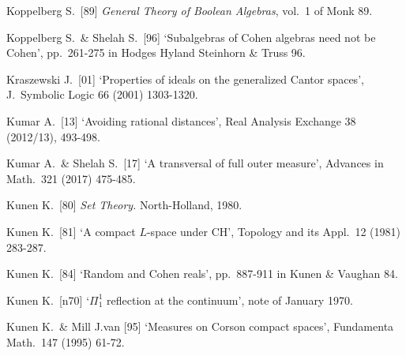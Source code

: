 {Koppelberg S.\ [89] {\it General Theory of Boolean
Algebras\/}, vol.\ 1 of {\smc Monk 89}.
\cmmnt{[\S515 {\it notes\/}.]}

Koppelberg S.\ \& Shelah S.\ [96]
`Subalgebras of Cohen algebras need not be Cohen',
pp.\ 261-275 in {\smc Hodges Hyland Steinhorn \& Truss 96}.

Kraszewski J.\ [01] `Properties of ideals on the generalized Cantor spaces',
J.\ Symbolic Logic 66 (2001) 1303-1320.
\cmmnt{[523G, 523H, 523J, \S523 {\it notes\/}.]}


Kumar A.\ [13] `Avoiding rational distances', Real Analysis Exchange 38
(2012/13), 493-498.
\cmmnt{[548Xb.]}


Kumar A.\ \& Shelah S.\ [17] `A transversal of full outer measure',
Advances in Math.\ 321 (2017) 475-485.
\cmmnt{[547P, 547Q, \S548 {\it intro.\/}, 548C.]}


Kunen K.\ [80] {\it Set Theory.}  North-Holland, 1980.

Kunen K.\ [81] `A compact $L$-space under CH', Topology and its Appl.\
12 (1981) 283-287.
\cmmnt{[\S531 {\it notes\/}.]}

Kunen K.\ [84] `Random and Cohen reals', pp.\ 887-911 in
{\smc Kunen \& Vaughan 84}.
\cmmnt{[\S554 {\it notes}.]}

Kunen K.\ [n70] `$\Pi^1_1$ reflection at the continuum', note of January
1970.
\cmmnt{[543C, 544C, 544E, 544F.]}

Kunen K.\ \& Mill J.van [95] `Measures on Corson compact spaces',
Fundamenta Math.\ 147 (1995) 61-72.
\cmmnt{[531O.]}

}
